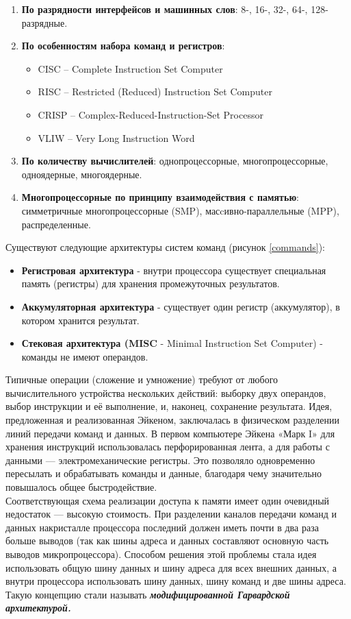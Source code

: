 \begin{enumerate}
  \item \textbf{По разрядности интерфейсов и машинных слов}: 8-, 16-, 32-, 64-, 128-разрядные.
  \item \textbf{По особенностям набора команд и регистров}:
  \begin{itemize}
    \item CISC – Complete Instruction Set Computer
    \item RISC – Restricted (Reduced) Instruction Set Computer
    \item CRISP – Complex-Reduced-Instruction-Set Processor
    \item VLIW – Very Long Instruction Word
  \end{itemize}
  \item \textbf{По количеству вычислителей}: однопроцессорные, многопроцессорные, одноядерные, многоядерные.
  \item \textbf{Многопроцессорные по принципу взаимодействия с памятью}: симметричные многопроцессорные (SMP), масcивно-параллельные (MPP), распределенные.
\end{enumerate}
Существуют следующие архитектуры систем команд (рисунок \ref{commands}):
\begin{itemize}
  \item \textbf{Регистровая архитектура} - внутри процессора существует специальная память (регистры) для хранения промежуточных результатов.
  \item \textbf{Аккумуляторная архитектура} - существует один регистр (аккумулятор), в котором хранится результат.
  \item \textbf{Стековая архитектура (MISC } - Minimal Instruction Set Computer) - команды не имеют операндов.
\end{itemize}
Типичные операции (сложение и умножение) требуют от любого вычислительного устройства нескольких действий: выборку двух операндов, выбор инструкции и её выполнение, и, наконец, сохранение результата. Идея, предложенная и  реализованная Эйкеном, заключалась в физическом разделении линий передачи команд и данных. В первом компьютере Эйкена «Марк I» для хранения инструкций использовалась перфорированная лента, а для работы с данными — электромеханические регистры. Это позволяло одновременно пересылать и обрабатывать команды и данные, благодаря чему значительно повышалось общее быстродействие.
\\Соответствующая схема реализации доступа к памяти имеет один очевидный недостаток — высокую стоимость. При разделении каналов передачи команд и данных накристалле процессора последний должен иметь почти в два раза больше выводов (так как шины адреса и данных составляют основную часть выводов микропроцессора). Способом решения этой проблемы стала идея использовать общую шину данных и шину адреса для всех внешних данных, а внутри процессора использовать шину данных, шину команд и две шины адреса. Такую концепцию стали называть \textbf { \emph{модифицированной Гарвардской архитектурой.}}
